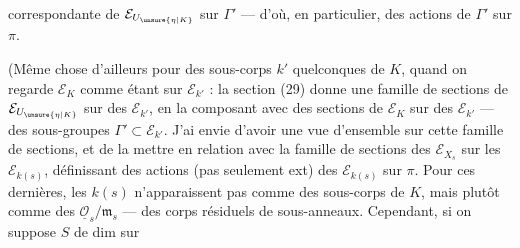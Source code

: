correspondante de $\mathcal E_{U_{\unsure{\eta|K}}}$ sur $\Gamma'$ --- d'où, en particulier, des actions de $\Gamma'$ sur $\pi$.

(Même chose d'ailleurs pour des sous-corps $k'$ quelconques de $K$, quand on regarde $\mathcal E_K$ comme étant sur $\mathcal E_{k'}$ : la section (29) donne une famille de sections de $\mathcal E_{U_{\unsure{\eta|K}}}$ sur des $\mathcal E_{k'}$,  en la composant avec des sections de $\mathcal E_K$ sur des $\mathcal E_{k'}$ --- des sous-groupes $\Gamma'\subset\mathcal E_{k'}$. J'ai envie d'avoir une vue d'ensemble sur cette famille de sections, et de la mettre en relation avec la famille de sections des $\mathcal E_{X_s}$ sur les $\mathcal E_{k(s)}$,  définissant des actions  (pas seulement ext) des $\mathcal E_{k(s)}$ sur $\pi$. Pour ces dernières, les $k(s)$ n'apparaissent pas comme des sous-corps de $K$, mais plutôt comme des $\underline{\mathcal O}_s/\mathfrak m_s$ --- des corps résiduels de sous-anneaux. Cependant, si on suppose $S$ de dim   sur
